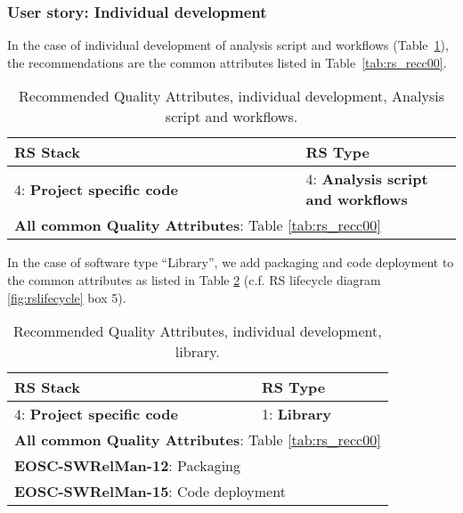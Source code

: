 \subsubsection{User story: Individual development}

In the case of individual development of analysis script and workflows (Table~\ref{tab:rs_recc01}), the recommendations are the common attributes listed in Table~\ref{tab:rs_recc00}.

\begin{center}
\begin{table}[h]
  \small
  \begin{tabular}{|p{0.65\linewidth}|p{0.35\linewidth}|} \hline

    \textbf{RS Stack} & \textbf{RS Type} \\ \hline \hline
    4: \textbf{Project specific code} &
    4: \textbf{Analysis script and workflows} \\ \hline \hline
    \multicolumn{2}{|l|}{\textbf{All common Quality Attributes}: Table \ref{tab:rs_recc00}} \\ \hline

  \end{tabular}
  \caption{Recommended Quality Attributes, individual development, Analysis script and workflows.}
  \label{tab:rs_recc01}
\end{table}
\end{center}

In the case of software type ``Library'', we add packaging and code deployment to the common attributes as listed in Table \ref{tab:rs_recc02} (c.f. RS lifecycle diagram \ref{fig:rslifecycle} box 5).

\begin{center}
\begin{table}[h]
  \small
  \begin{tabular}{|p{0.65\linewidth}|p{0.35\linewidth}|} \hline

    \textbf{RS Stack} & \textbf{RS Type} \\ \hline \hline
    4: \textbf{Project specific code} &
    1: \textbf{Library} \\ \hline \hline
    \multicolumn{2}{|l|}{\textbf{All common Quality Attributes}: Table \ref{tab:rs_recc00}} \\ \hline
    \multicolumn{2}{|l|}{\textbf{EOSC-SWRelMan-12}: Packaging} \\ \hline
    \multicolumn{2}{|l|}{\textbf{EOSC-SWRelMan-15}: Code deployment} \\ \hline

  \end{tabular}
  \caption{Recommended Quality Attributes, individual development, library.}
  \label{tab:rs_recc02}
\end{table}
\end{center}

